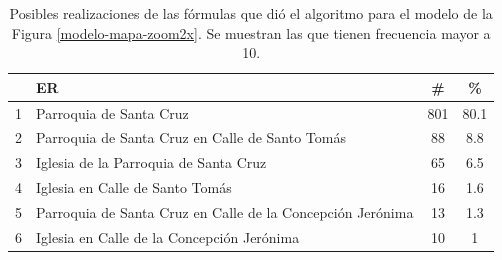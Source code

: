 




\begin{table}[h]
\begin{center}
\begin{tabular}{|l|l|c|c|}
\hline
&ER			      &  \# &\% \\ \hline \hline
1& Parroquia de Santa Cruz& 801&80.1\\ \hline
2& Parroquia de Santa Cruz en Calle de Santo Tom\'as& 88&8.8\\ \hline
3& Iglesia de la Parroquia de Santa Cruz& 65&6.5\\ \hline
4& Iglesia en Calle de Santo Tom\'as&16&1.6\\ \hline
5& Parroquia de Santa Cruz en Calle de la Concepci\'on Jer\'onima& 13&1.3\\ \hline
6& Iglesia en Calle de la Concepci\'on Jer\'onima &10&1\\ \hline


\end{tabular}

\caption{Posibles realizaciones de las f\'ormulas que di\'o el algoritmo para el modelo de la Figura \protect\ref{modelo-mapa-zoom2x}. Se muestran las que tienen frecuencia mayor a 10.}\label{formulas-mapa-zoom2x}
\end{center}
\end{table}


